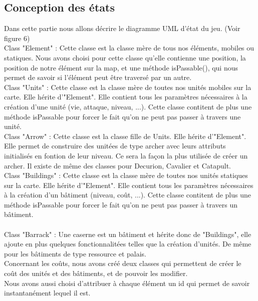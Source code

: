 \documentclass[12pt,a4paper]{article}
\begin{document}
\subsection{Conception des états}
Dans cette partie nous allons décrire le diagramme UML d'état du jeu. (Voir figure 6)\\

Class "Element" : Cette classe est la classe mère de tous nos éléments, mobiles ou statiques. Nous avons choisi pour cette classe qu'elle contienne une position, la position de notre élément sur la map, et une méthode isPassable(), qui nous permet de savoir si l'élément peut être traversé par un autre.\\

Class "Units" : Cette classe est la classe mère de toutes nos unités mobiles sur la carte. Elle hérite d'"Element". Elle contient tous les paramètres nécessaires à la création d'une unité (vie, attaque, niveau, ...). Cette classe contitent de plus une méthode isPassable pour forcer le fait qu'on ne peut pas passer à travers une unité.\\

Class "Arrow" : Cette classe est la classe fille de Units. Elle hérite d'"Element". Elle permet de construire des unitées de type archer avec leurs attributs initialisés en fontion de leur niveau. Ce sera la façon la plus utilisée de créer un archer. Il existe de même des classes pour Decurion, Cavalier et Catapult.\\

Class "Buildings" : Cette classe est la classe mère de toutes nos unités statiques sur la carte. Elle hérite d'"Element". Elle contient tous les paramètres nécessaires à la création d'un bâtiment (niveau, coût, ...). Cette classe contitent de plus une méthode isPassable pour forcer le fait qu'on ne peut pas passer à travers un bâtiment.\\\\

Class "Barrack" : Une caserne est un bâtiment et hérite donc de "Buildings", elle ajoute en plus quelques fonctionnalitées telles que la création d'unités. De même pour les bâtiments de type ressource et palais.\\

Concernant les coûts, nous avons créé deux classes qui permettent de créer le coût des unités et des bâtiments, et de pouvoir les modifier.\\

Nous avons aussi choisi d'attribuer à chaque élément un id qui permet de savoir instantanément lequel il est.\\
\end{document}

